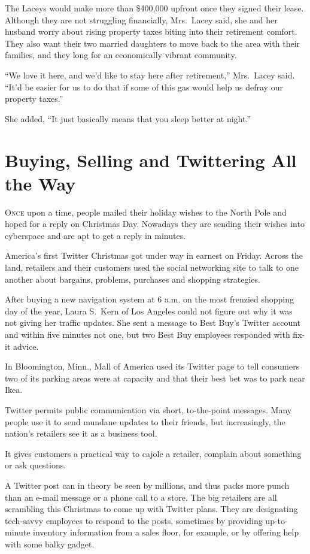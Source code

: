 ﻿\documentclass[12pt]{article}
\begin{document}
The Laceys would make more than \$400,000 upfront once they signed their lease. Although they are
not struggling financially, Mrs.~Lacey said, she and her husband worry about rising property taxes
biting into their retirement comfort. They also want their two married daughters to move back to the
area with their families, and they long for an economically vibrant community.

``We love it here, and we'd like to stay here after retirement,'' Mrs.~Lacey said. ``It'd be easier
for us to do that if some of this gas would help us defray our property taxes.''

She added, ``It just basically means that you sleep better at night.''

\section{Buying, Selling and Twittering All the Way}

\lettrine{O}{nce} upon a time, people mailed their holiday wishes to the
North Pole and hoped for a reply on Christmas Day. Nowadays they are sending their wishes into
cyberspace and are apt to get a reply in minutes.

America's first Twitter Christmas got under way in earnest on Friday. Across the land, retailers and
their customers used the social networking site to talk to one another about bargains, problems,
purchases and shopping strategies.

After buying a new navigation system at 6 a.m. on the most frenzied shopping day of the year, Laura
S.~Kern of Los Angeles could not figure out why it was not giving her traffic updates. She sent a
message to Best Buy's Twitter account and within five minutes not one, but two Best Buy employees
responded with fix-it advice.

In Bloomington, Minn., Mall of America used its Twitter page to tell consumers two of its parking
areas were at capacity and that their best bet was to park near Ikea.

Twitter permits public communication via short, to-the-point messages. Many people use it to send
mundane updates to their friends, but increasingly, the nation's retailers see it as a business
tool.

It gives customers a practical way to cajole a retailer, complain about something or ask questions.

A Twitter post can in theory be seen by millions, and thus packs more punch than an e-mail message
or a phone call to a store. The big retailers are all scrambling this Christmas to come up with
Twitter plans. They are designating tech-savvy employees to respond to the posts, sometimes by
providing up-to-minute inventory information from a sales floor, for example, or by offering help
with some balky gadget.
\end{document}
